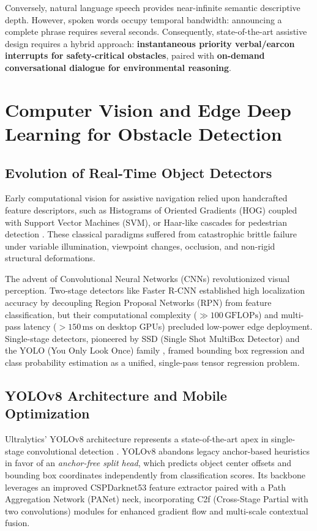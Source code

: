\documentclass[10pt,twocolumn]{article}
\begin{document}
Conversely, natural language speech provides near-infinite semantic descriptive depth. However, spoken words occupy temporal bandwidth: announcing a complete phrase requires several seconds. Consequently, state-of-the-art assistive design requires a hybrid approach: \textbf{instantaneous priority verbal/earcon interrupts for safety-critical obstacles}, paired with \textbf{on-demand conversational dialogue for environmental reasoning}.

\section{Computer Vision and Edge Deep Learning for Obstacle Detection}
\label{sec:edge_vision}

\subsection{Evolution of Real-Time Object Detectors}
Early computational vision for assistive navigation relied upon handcrafted feature descriptors, such as Histograms of Oriented Gradients (HOG) coupled with Support Vector Machines (SVM), or Haar-like cascades for pedestrian detection \cite{dalal2005histograms}. These classical paradigms suffered from catastrophic brittle failure under variable illumination, viewpoint changes, occlusion, and non-rigid structural deformations.

The advent of Convolutional Neural Networks (CNNs) revolutionized visual perception. Two-stage detectors like Faster R-CNN \cite{ren2015faster} established high localization accuracy by decoupling Region Proposal Networks (RPN) from feature classification, but their computational complexity ($\gg 100\,\text{GFLOPs}$) and multi-pass latency ($>150\,\text{ms}$ on desktop GPUs) precluded low-power edge deployment. Single-stage detectors, pioneered by SSD (Single Shot MultiBox Detector) \cite{liu2016ssd} and the YOLO (You Only Look Once) family \cite{redmon2016you}, framed bounding box regression and class probability estimation as a unified, single-pass tensor regression problem.

\subsection{YOLOv8 Architecture and Mobile Optimization}
Ultralytics' YOLOv8 architecture represents a state-of-the-art apex in single-stage convolutional detection \cite{jocher2023ultralytics}. YOLOv8 abandons legacy anchor-based heuristics in favor of an \textit{anchor-free split head}, which predicts object center offsets and bounding box coordinates independently from classification scores. Its backbone leverages an improved CSPDarknet53 feature extractor paired with a Path Aggregation Network (PANet) neck, incorporating C2f (Cross-Stage Partial with two convolutions) modules for enhanced gradient flow and multi-scale contextual fusion.
\end{document}
